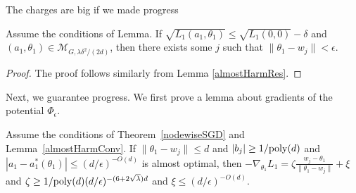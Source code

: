The charges are big if we made progress
%
\begin{lemma}\label{nodeRes}
  Assume the conditions of Lemma. If
$\sqrt{L_1(a_1,\theta_1)} \leq \sqrt{L_1(0, 0)} - \delta$
  and $(a_1,\theta_1) \in \mathcal{M}_{G,\lambda \delta^2/(2d)}$,
  then there exists some $j$ such that $\|\theta_1 - w_j\| <\epsilon$.
\end{lemma}

\begin{proof}
The proof follows similarly from Lemma \ref{almostHarmRes}.
\end{proof}
 Next, we guarantee progress. We first prove a lemma about gradients of the potential $\Phi_\epsilon$.

\begin{lemma}\label{nodeGradient}
Assume the conditions of Theorem~\ref{nodewiseSGD} and Lemma~\ref{almostHarmConv}. If $\|\theta_1 - w_j\| \leq d$ and $|b_j|\geq 1/\mathrm{poly}(d)$ and $|a_1 - a_1^*(\theta_1)| \leq (d/\epsilon)^{-O(d)}$ is almost optimal, then $-\nabla_{\theta_1}L_1 = \zeta \frac{w_j - \theta_1}{\|\theta_1 - w_j\|} + \xi$ and $\zeta \geq  1/\mathrm{poly}(d)(d/\epsilon)^{-(6+2\sqrt{\lambda})d}$ and $\xi \leq (d/\epsilon)^{-O(d)}$. 
\end{lemma}


